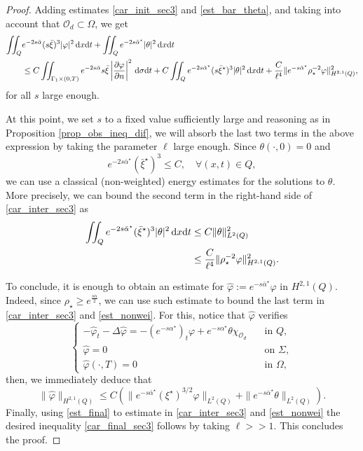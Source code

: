 \documentclass{aims}
\theoremstyle{definition}
\def\dx{\,\textnormal{d}x}
\def\dt{\textnormal{d}t}
\def\d{\,\textnormal{d}}
\begin{document}
\begin{proof}
Adding estimates \eqref{car_init_sec3} and \eqref{est_bar_theta}, and taking into account that $\mathcal O_d\subset\Omega$, we get
%
\begin{align} \notag
\iint_{Q}&e^{-2s\bar\alpha}(s\bar\xi)^3|\varphi|^2\dx\dt+\iint_{Q}e^{-2s\bar\alpha^\star}|\theta|^2\dx\dt \\ \label{car_inter_sec3}
&\leq C\iint_{\Gamma_1\times(0,T)}e^{-2s\bar\alpha}s\bar\xi\left|\frac{\partial \varphi}{\partial n}\right|^2\d\sigma\dt+C\iint_{Q}e^{-2s\bar\alpha^\star}(s\bar\xi^\star)^3|\theta|^2\dx\dt+\frac{C}{\ell^4}\|e^{-s\bar\alpha^\star}\rho_\star^{-2}\varphi\|^2_{H^{2,1}(Q)},
\end{align}
%
for all $s$ large enough. 

At this point, we set $s$ to a fixed value sufficiently large and reasoning as in Proposition \ref{prop_obs_ineq_dif}, we will absorb the last two terms in the above expression by taking the parameter $\ell$ large enough. Since $\theta(\cdot,0)=0$ and
%
\begin{equation*}
e^{-2s\bar\alpha^\star}({\bar\xi^\star})^3\leq C, \quad \forall (x,t)\in Q,
\end{equation*}
% 
we can use a classical (non-weighted) energy estimates for the solutions to $\theta$. More precisely, we can bound the second term in the right-hand side of \eqref{car_inter_sec3} as
%
\begin{align}\notag
\iint_{Q}e^{-2s\bar\alpha^\star}({\bar\xi^\star})^3|\theta|^2\dx\dt&\leq C\|\theta\|^2_{L^2(Q)}  \\ \label{est_nonwei}
&\leq \frac{C}{\ell^4}\|\rho_\star^{-2}\varphi\|^2_{H^{2,1}(Q)}. 
\end{align}
%

To conclude, it is enough to obtain an estimate for $\widehat{\varphi}:=e^{-s\bar\alpha^\star}\varphi$ in $H^{2,1}(Q)$. Indeed, since $\rho_\star\geq e^{\frac{s\alpha}{2}}$, we can use such estimate to bound the last term in \eqref{car_inter_sec3} and \eqref{est_nonwei}. For this, notice that $\widehat{\varphi}$ verifies
%
\begin{equation*}%
\begin{cases}
-\widehat\varphi_t-\Delta \widehat\varphi=-(e^{-s\alpha^\star})_t\varphi+e^{-s\alpha^\star}\theta\chi_{\mathcal O_d} &\quad \text{in } Q, \\
\widehat\varphi=0 &\quad \text{on } \Sigma, \\
\widehat{\varphi}(\cdot,T)=0 &\quad\text{in } \Omega,
\end{cases}
\end{equation*}
%
then, we immediately deduce that
%
\begin{equation}\label{est_final}
\|\widehat{\varphi}\|_{H^{2,1}(Q)}\leq C\left(\|e^{-s\bar\alpha^\star}(\xi^\star)^{3/2}\varphi\|_{L^2(Q)}+\|e^{-s\bar\alpha^\star}\theta\|_{L^2(Q)}\right).
\end{equation}
%
Finally, using \eqref{est_final} to estimate in \eqref{car_inter_sec3} and \eqref{est_nonwei} the desired inequality \eqref{car_final_sec3} follows by taking $\ell>>1$. This concludes the proof.
%
\end{proof}
\end{document}
